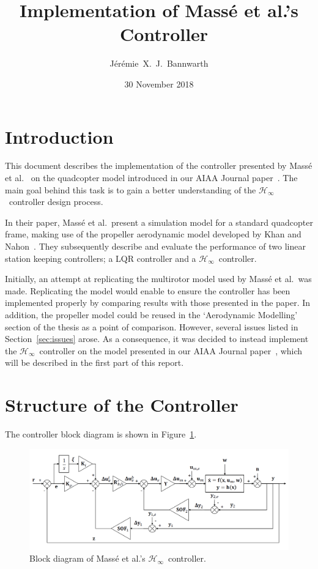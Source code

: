 \documentclass[a4paper,12pt]{article}
\title{Implementation of Mass{\'e} et al.'s \Hinf\ Controller}
\author{J{\'e}r{\'e}mie~X.~J.~Bannwarth}
\date{30 November 2018}
\newcommand{\hinf}{\mathcal{H}_\infty}
\newcommand{\Hinf}{\(\hinf\)}
\begin{document}
    \maketitle

    \section{Introduction}

        This document describes the implementation of the controller presented by Mass{\'e} et al.~\cite{MasseEtAl2018} on the quadcopter model introduced in our AIAA Journal paper~\cite{BannwarthEtAl2018}. The main goal behind this task is to gain a better understanding of the \Hinf\ controller design process.
        
        In their paper, Mass{\'e} et al.\ present a simulation model for a standard quadcopter frame, making use of the propeller aerodynamic model developed by Khan and Nahon~\cite{KhanNahon2013,KhanNahon2015}. They subsequently describe and evaluate the performance of two linear station keeping controllers; a LQR controller and a \Hinf\ controller.

        Initially, an attempt at replicating the multirotor model used by Mass{\'e} et al.\ was made. Replicating the model would enable to ensure the controller has been implemented properly by comparing results with those presented in the paper. In addition, the propeller model could be reused in the `Aerodynamic Modelling' section of the thesis as a point of comparison. However, several issues listed in Section~\ref{sec:issues} arose. As a consequence, it was decided to instead implement the \Hinf\ controller on the model presented in our AIAA Journal paper~\cite{BannwarthEtAl2018}, which will be described in the first part of this report.

    \newpage
    \section{Structure of the Controller}

        The controller block diagram is shown in Figure~\ref{fig:ctrl_block_diag}.
        
        \begin{figure}[h!]
            \centering%
            \includegraphics[width=16cm]{ctrl_block_diag.png}%
            \caption{Block diagram of Mass{\'e} et al.'s \Hinf\ controller.}\label{fig:ctrl_block_diag}
        \end{figure}
\end{document}
